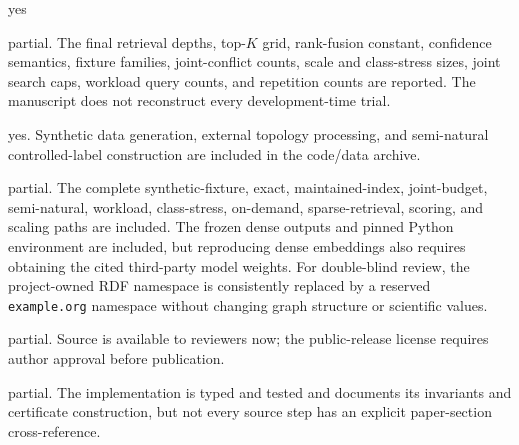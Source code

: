 \documentclass[letterpaper]{article}
\begin{document}
\begin{itemize}

yes

\begin{itemize}

		partial. The final retrieval depths, top-$K$ grid, rank-fusion constant,
		confidence semantics, fixture families, joint-conflict counts, scale and
		class-stress sizes, joint search caps, workload query counts, and
		repetition counts are reported. The manuscript
		does not reconstruct every
		development-time trial.

		yes. Synthetic data generation, external topology processing, and
		semi-natural controlled-label construction are included in the
		code/data archive.

		partial. The complete synthetic-fixture, exact, maintained-index,
		joint-budget, semi-natural, workload, class-stress, on-demand,
		sparse-retrieval, scoring, and scaling paths are included.
		The frozen dense outputs and pinned Python environment are included, but
		reproducing dense embeddings also requires obtaining the cited
		third-party model weights. For double-blind review, the project-owned
		RDF namespace is consistently replaced by a reserved
		\texttt{example.org} namespace without changing graph structure or
		scientific values.

		partial. Source is available to reviewers now; the public-release license
		requires author approval before publication.

		partial. The implementation is typed and tested and documents its
		invariants and certificate construction, but not every source step has
		an explicit paper-section cross-reference.


\end{itemize}
\end{itemize}
\end{document}
